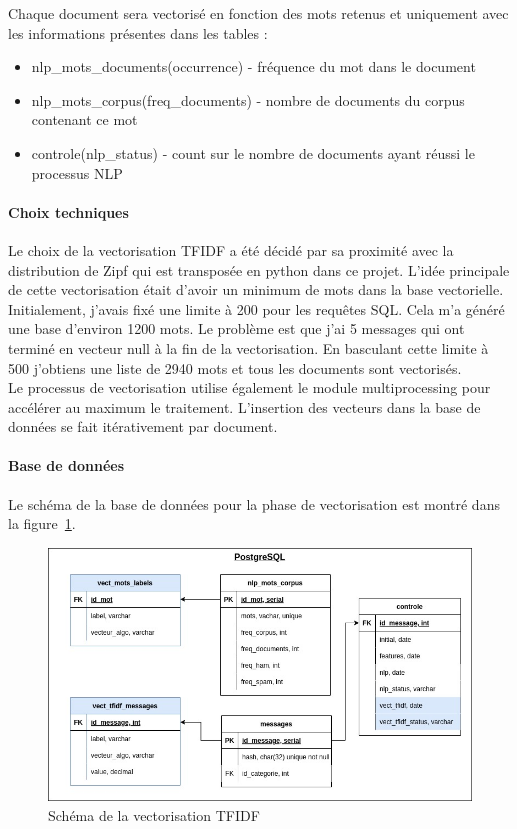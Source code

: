         Chaque document sera vectorisé en fonction des mots retenus et uniquement avec les informations présentes dans les tables :
        \begin{itemize}
            \item nlp\_mots\_documents(occurrence) - fréquence du mot dans le document
            \item nlp\_mots\_corpus(freq\_documents) - nombre de documents du corpus contenant ce mot
            \item controle(nlp\_status) - count sur le nombre de documents ayant réussi le processus NLP
        \end{itemize}

        \paragraph{Choix techniques}
            Le choix de la vectorisation TFIDF a été décidé par sa proximité avec la distribution de Zipf qui est transposée en python dans ce projet.
            L'idée principale de cette vectorisation était d'avoir un minimum de mots dans la base vectorielle.
            Initialement, j'avais fixé une limite à 200 pour les requêtes SQL\@.
            Cela m'a généré une base d'environ 1200 mots.
            Le problème est que j'ai 5 messages qui ont terminé en vecteur null à la fin de la vectorisation.
            En basculant cette limite à 500 j'obtiens une liste de 2940 mots et tous les documents sont vectorisés.\\

            Le processus de vectorisation utilise également le module multiprocessing pour accélérer au maximum le traitement.
            L'insertion des vecteurs dans la base de données se fait itérativement par document.

        \paragraph{Base de données}
            Le schéma de la base de données pour la phase de vectorisation est montré dans la figure~\ref{fig:tfidf_bdd}.
            \begin{figure}[H]
                \includegraphics[width=\linewidth]{img/tfidf_bdd}
                \caption{Schéma de la vectorisation TFIDF}
                \label{fig:tfidf_bdd}
            \end{figure}

